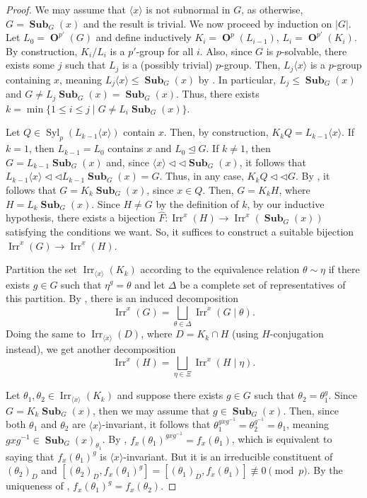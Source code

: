 \documentclass[12pt]{amsart}
\DeclareMathOperator{\OB}{\mathbf{O}}
\DeclareMathOperator{\Syl}{Syl}
\DeclareMathOperator{\Sub}{\mathbf{Sub}}
\DeclareMathOperator{\Irr}{Irr}
\theoremstyle{remark}
\theoremstyle{definition}
\theoremstyle{plain}
\theoremstyle{definition}
\numberwithin{equation}{section}
\begin{document}
\begin{proof}
	We may assume that $\langle x \rangle$ is not subnormal in $G$, as otherwise, $G = \Sub_G(x)$ and the result is trivial. We now proceed by induction on $|G|$. Let $L_0 = \OB^{p'}(G)$ and define inductively $K_i = \OB^p(L_{i-1})$, $L_i = \OB^{p'}(K_i)$. By construction, $K_i/L_i$ is a $p'$-group for all $i$. Also, since $G$ is $p$-solvable, there exists some $j$ such that $L_j$ is a (possibly trivial) $p$-group. Then, $L_j \langle x \rangle$ is a $p$-group containing $x$, meaning $L_j\langle x \rangle \leq \Sub_G(x)$ by . In particular, $L_j \leq \Sub_G(x)$ and $G \neq L_j \Sub_G(x) = \Sub_G(x)$. Thus, there exists $k = \min \{1 \leq i \leq j \mid G \neq L_i \Sub_G(x)\}$.
	
	Let $Q \in \Syl_p(L_{k-1}\langle x \rangle)$ contain $x$. Then, by construction, $K_k Q = L_{k-1}\langle x \rangle$. If $k = 1$, then $L_{k-1} = L_0$ contains $x$ and $L_0 \unlhd G$. If $k \neq 1$, then $G = L_{k-1}\Sub_G(x)$ and, since $\langle x \rangle {\triangleleft}{\triangleleft} \Sub_G(x)$, it follows that $L_{k-1}\langle x \rangle {\triangleleft}{\triangleleft} L_{k-1}\Sub_G(x) = G$. Thus, in any case, $K_kQ {\triangleleft}{\triangleleft} G$. By , it follows that $G = K_k \Sub_G(x)$, since $x \in Q$. Then, $G = K_k H$, where $H = L_k \Sub_G(x)$. Since $H \neq G$ by the definition of $k$, by our inductive hypothesis, there exists a bijection $\hat{F} : \Irr^x(H) \to \Irr^x(\Sub_G(x))$ satisfying the conditions we want. So, it suffices to construct a suitable bijection $\Irr^x(G) \to \Irr^x(H)$.
	
	Partition the set $\Irr_{\langle x \rangle}(K_k)$ according to the equivalence relation $\theta \sim \eta$ if there exists $g \in G$ such that $\eta^g = \theta$ and let $\Delta$ be a complete set of representatives of this partition. By , there is an induced decomposition
	\begin{equation*}
		\Irr^x(G) = \bigsqcup_{\theta \in \Delta} \Irr^x(G \mid \theta).
	\end{equation*}
	Doing the same to $\Irr_{\langle x \rangle}(D)$, where $D = K_k \cap H$ (using $H$-conjugation instead), we get another decomposition
	\begin{equation*}
		\Irr^x(H) = \bigsqcup_{\eta \in \Xi} \Irr^x(H \mid \eta).
	\end{equation*}
	
	Let $\theta_1, \theta_2 \in \Irr_{\langle x \rangle}(K_k)$ and suppose there exists $g \in G$ such that $\theta_2 = \theta_1^g$. Since $G = K_k \Sub_G(x)$, then we may assume that $g \in \Sub_G(x)$. Then, since both $\theta_1$ and $\theta_2$ are $\langle x \rangle$-invariant, it follows that $\theta_1^{gxg^{-1}} = \theta_2^{g^{-1}} = \theta_1$, meaning $gxg^{-1} \in \Sub_G(x)_{\theta_1}$. By , $f_x(\theta_1)^{gxg^{-1}} = f_x(\theta_1)$, which is equivalent to saying that $f_x(\theta_1)^g$ is $\langle x \rangle$-invariant. But it is an irreducible constituent of $(\theta_2)_D$ and $[(\theta_2)_D, f_x(\theta_1)^g] = [(\theta_1)_D, f_x(\theta_1)] \not \equiv 0 \pmod{p}$. By the uniqueness of , $f_x(\theta_1)^g = f_x(\theta_2)$. 
	

\end{proof}
\end{document}
